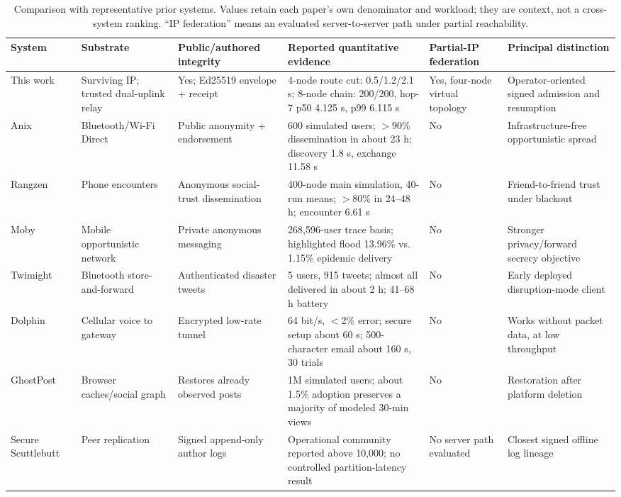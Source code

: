 \documentclass[sigconf,anonymous]{acmart}
\begin{document}
\begin{table}[t]
\caption{Comparison with representative prior systems. Values retain each paper's own denominator
and workload; they are context, not a cross-system ranking. ``IP federation'' means an evaluated
server-to-server path under partial reachability.}
\label{tab:related}
\centering
\scriptsize
\setlength{\tabcolsep}{3.1pt}
\begin{tabular}{p{1.55cm}p{2.05cm}p{1.55cm}p{3.35cm}p{2.1cm}p{2.55cm}}
\toprule
System & Substrate & Public/authored integrity & Reported quantitative evidence & Partial-IP federation & Principal distinction \\
\midrule
This work & Surviving IP; trusted dual-uplink relay & Yes; Ed25519 envelope + receipt & 4-node route cut: 0.5/1.2/2.1 s; 8-node chain: 200/200, hop-7 p50 4.125 s, p99 6.115 s & Yes, four-node virtual topology & Operator-oriented signed admission and resumption \\
Anix~\cite{kamali2025anix} & Bluetooth/Wi-Fi Direct & Public anonymity + endorsement & 600 simulated users; $>$90\% dissemination in about 23 h; discovery 1.8 s, exchange 11.58 s & No & Infrastructure-free opportunistic spread \\
Rangzen~\cite{lerner2016rangzen} & Phone encounters & Anonymous social-trust dissemination & 400-node main simulation, 40-run means; $>$80\% in 24--48 h; encounter 6.61 s & No & Friend-to-friend trust under blackout \\
Moby~\cite{pradeep2022moby} & Mobile opportunistic network & Private anonymous messaging & 268,596-user trace basis; highlighted flood 13.96\% vs. 1.15\% epidemic delivery & No & Stronger privacy/forward secrecy objective \\
Twimight~\cite{hossmann2011twimight} & Bluetooth store-and-forward & Authenticated disaster tweets & 5 users, 915 tweets; almost all delivered in about 2 h; 41--68 h battery & No & Early deployed disruption-mode client \\
Dolphin~\cite{sharma2023dolphin} & Cellular voice to gateway & Encrypted low-rate tunnel & 64 bit/s, $<$2\% error; secure setup about 60 s; 500-character email about 160 s, 30 trials & No & Works without packet data, at low throughput \\
GhostPost~\cite{douglas2016ghostpost} & Browser caches/social graph & Restores already observed posts & 1M simulated users; about 1.5\% adoption preserves a majority of modeled 30-min views & No & Restoration after platform deletion \\
Secure Scuttlebutt~\cite{tarr2019ssb} & Peer replication & Signed append-only author logs & Operational community reported above 10,000; no controlled partition-latency result & No server path evaluated & Closest signed offline log lineage \\

\end{tabular}
\end{table}
\end{document}
